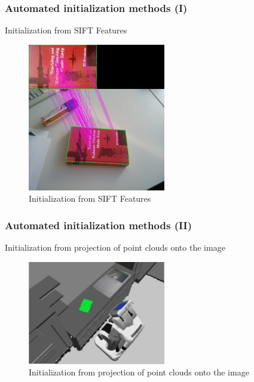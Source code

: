 \documentclass[english,10pt,presentation]{beamer}
\begin{document}
\begin{frame}
\frametitle{Automated initialization methods (I)}
\label{sec-3_5}
\begin{block}{Initialization from SIFT Features}
\label{sec-3_5_1}

    \begin{figure}[htb]
    \centering
    \includegraphics[width=6cm,angle=0]{./sift.jpg}
    \caption{\label{fig:sift}Initialization from SIFT Features}
    \end{figure}
\end{block}
\end{frame}
\begin{frame}
\frametitle{Automated initialization methods (II)}
\label{sec-3_6}
\begin{block}{Initialization from projection of point clouds onto the image}
\label{sec-3_6_1}

    \begin{figure}[htb]
    \centering
    \includegraphics[width=6cm,angle=0]{./pr2b.jpg}
    \caption{\label{fig:sift}Initialization from projection of point clouds onto the image}
    \end{figure}
\end{block}
\end{frame}
\end{document}
